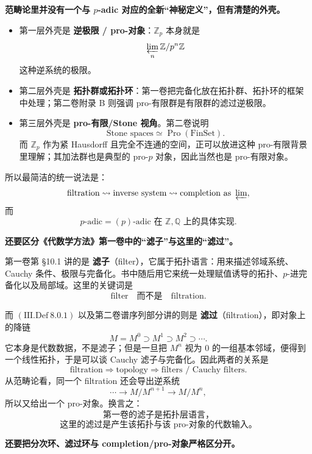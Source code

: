 \documentclass[a4paper]{ctexart}
\theoremstyle{definition}
\theoremstyle{analysis}
\theoremstyle{plain}
\begin{document}
\medskip

\textbf{范畴论里并没有一个与 \(p\)-adic 对应的全新“神秘定义”，但有清楚的外壳。}
\begin{itemize}
  \item 第一层外壳是 \textbf{逆极限 / pro-对象}：\(\mathbb Z_p\) 本身就是
  \[
    \varprojlim_n \mathbb Z/p^n\mathbb Z
  \]
  这种逆系统的极限。
  \item 第二层外壳是 \textbf{拓扑群或拓扑环}：第一卷把完备化放在拓扑群、拓扑环的框架中处理；第二卷附录 B 则强调 pro-有限群是有限群的滤过逆极限。
  \item 第三层外壳是 \textbf{pro-有限/Stone 视角}。第二卷说明
  \[
    \text{Stone spaces}\simeq \operatorname{Pro}(\mathrm{FinSet}).
  \]
  而 \(\mathbb Z_p\) 作为紧 Hausdorff 且完全不连通的空间，正可以放进这种 pro-有限背景里理解；其加法群也是典型的 pro-\(p\) 对象，因此当然也是 pro-有限对象。
\end{itemize}

所以最简洁的统一说法是：
\[
  \text{filtration}
  \rightsquigarrow
  \text{inverse system}
  \rightsquigarrow
  \text{completion as }\varprojlim,
\]
而
\[
  p\text{-adic}
  =
  (p)\text{-adic}
  \text{ 在 } \mathbb Z,\mathbb Q \text{ 上的具体实现}.
\]

\medskip

\label{rem:filter-vs-filtration}
\textbf{还要区分《代数学方法》第一卷中的“滤子”与这里的“滤过”。}

第一卷第 \S 10.1 讲的是 \textbf{滤子}（filter），它属于拓扑语言：用来描述邻域系统、Cauchy 条件、极限与完备化。书中随后用它来统一处理赋值诱导的拓扑、\(p\)-进完备化以及局部域。这里的关键词是
\[
  \text{filter} \quad\text{而不是}\quad \text{filtration}.
\]

而 \((\mathrm{III.Def}\ 8.0.1)\) 以及第二卷谱序列部分讲的则是 \textbf{滤过}（filtration），即对象上的降链
\[
  M=M^0\supset M^1\supset M^2\supset \cdots .
\]
它本身是代数数据，不是滤子；但是一旦把 \(M^n\) 视为 \(0\) 的一组基本邻域，便得到一个线性拓扑，于是可以谈 Cauchy 滤子与完备化。因此两者的关系是
\[
  \text{filtration}
  \Longrightarrow
  \text{topology}
  \Longrightarrow
  \text{filters / Cauchy filters}.
\]
从范畴论看，同一个 filtration 还会导出逆系统
\[
  \cdots \to M/M^{n+1}\to M/M^n,
\]
所以又给出一个 pro-对象。换言之：
\[
  \text{第一卷的滤子是拓扑层语言，}
\]
\[
  \text{这里的滤过是产生该拓扑与该 pro-对象的代数输入。}
\]

\medskip

\label{rem:graded-filtered-completion}
\textbf{还要把分次环、滤过环与 completion/pro-对象严格区分开。}
\end{document}
